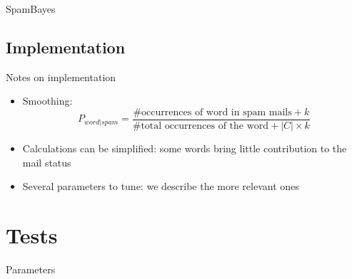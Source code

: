 \documentclass[xcolor=x11names,compress]{beamer}
\renewcommand{\(}{\begin{columns}}
\renewcommand{\)}{\end{columns}}
\newcommand{\<}[1]{\begin{column}{#1}}
\renewcommand{\>}{\end{column}}
\begin{document}

\begin{frame}{SpamBayes}
  \begin{center}
  \end{center}
\end{frame}

\subsection{Implementation}
\begin{frame}{Notes on implementation}
\begin{itemize}
    \item<1->Smoothing:
      $$P_{word|spam} = \frac{\mbox{\# occurrences of word in spam mails} + k}{\mbox{\# total occurrences of the word} + |C|\times k}$$
    \item<2->Calculations can be simplified: some words bring little contribution to the mail status
    \item<3->Several parameters to tune: we describe the more relevant ones
\end{itemize}
\end{frame}

\section{Tests}
\begin{frame}{Parameters}
\end{frame}
\end{document}
